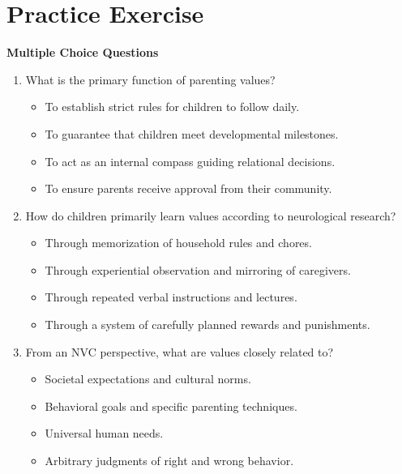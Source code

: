 \section{Practice Exercise}
\begin{practiceexercise}
\textbf{Multiple Choice Questions}
\begin{enumerate}
  \item What is the primary function of parenting values?
    \begin{itemize}
      \item[A)] To establish strict rules for children to follow daily.
      \item[B)] To guarantee that children meet developmental milestones.
      \item[C)] To act as an internal compass guiding relational decisions.
      \item[D)] To ensure parents receive approval from their community.
    \end{itemize}
  \vspace{\fill}
  \item How do children primarily learn values according to neurological research?
    \begin{itemize}
      \item[A)] Through memorization of household rules and chores.
      \item[B)] Through experiential observation and mirroring of caregivers.
      \item[C)] Through repeated verbal instructions and lectures.
      \item[D)] Through a system of carefully planned rewards and punishments.
    \end{itemize}
  \vspace{\fill}
  \item From an NVC perspective, what are values closely related to?
    \begin{itemize}
      \item[A)] Societal expectations and cultural norms.
      \item[B)] Behavioral goals and specific parenting techniques.
      \item[C)] Universal human needs.
      \item[D)] Arbitrary judgments of right and wrong behavior.
    \end{itemize}
\end{enumerate}
\vspace{\fill}

\newpage


\end{practiceexercise}
